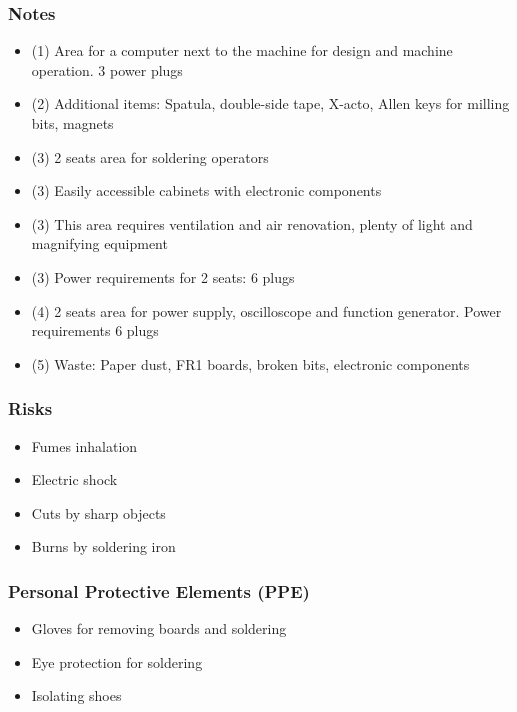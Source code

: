 \documentclass[a4paper,12pt,titlepage]{article}
\begin{document}
\subsubsection*{Notes}
\begin{itemize}
\item (1) Area for a computer next to the machine for design and machine operation. 3 power plugs
\item (2) Additional items: Spatula, double-side tape, X-acto, Allen keys for milling bits, magnets
\item (3) 2 seats area for soldering operators
\item (3) Easily accessible cabinets with electronic components
\item (3) This area requires ventilation and air renovation, plenty of light and magnifying equipment
\item (3) Power requirements for 2 seats: 6 plugs
\item (4) 2 seats area for power supply, oscilloscope and function generator. Power requirements 6 plugs
\item (5) Waste: Paper dust, FR1 boards, broken bits, electronic components
\end{itemize}
\subsubsection*{Risks}
\begin{itemize}
\item Fumes inhalation
\item Electric shock
\item Cuts by sharp objects
\item Burns by soldering iron
\end{itemize}
\subsubsection*{Personal Protective Elements (PPE)}
\begin{itemize}
\item Gloves for removing boards and soldering
\item Eye protection for soldering
\item Isolating shoes
\end{itemize}
\clearpage
\end{document}
